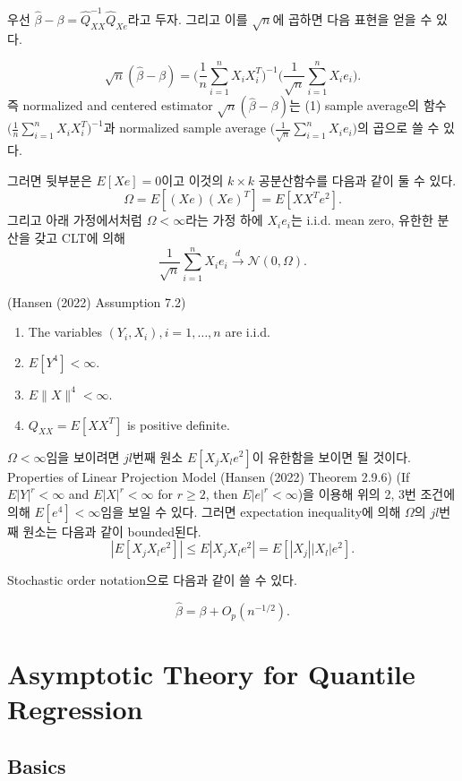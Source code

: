 \documentclass[
  letterpaper,
  DIV=11,
  numbers=noendperiod]{scrreprt}
\providecommand{\tightlist}{%
  \setlength{\itemsep}{0pt}\setlength{\parskip}{0pt}}\usepackage{longtable,booktabs,array}
\theoremstyle{definition}
\theoremstyle{plain}
\theoremstyle{definition}
\theoremstyle{definition}
\theoremstyle{remark}
\begin{document}
우선 \(\hat{\beta}- \beta = \hat{Q}_{XX}^{-1}\hat{Q}_{Xe}\)라고 두자.
그리고 이를 \(\sqrt{n}\)에 곱하면 다음 표현을 얻을 수 있다.

\[
\sqrt{n}(\hat{\beta} - \beta) = \Big( \frac{1}{n}\sum_{i=1}^n X_i X_i^T \Big)^{-1} \Big(\frac{1}{\sqrt{n} }\sum_{i=1}^n X_i e_i \Big).
\]즉 normalized and centered estimator
\(\sqrt{n}(\hat{\beta} - \beta)\)는 (1) sample average의 함수
\(\Big( \frac{1}{n}\sum_{i=1}^n X_i X_i^T \Big)^{-1}\)과 normalized
sample average \(\Big(\frac{1}{\sqrt{n} }\sum_{i=1}^n X_i e_i \Big)\)의
곱으로 쓸 수 있다.

그러면 뒷부분은 \(E[Xe]=0\)이고 이것의 \(k\times k\) 공분산함수를 다음과
같이 둘 수 있다. \[
\Omega = E[(Xe)(Xe)^T] = E[XX^T e^2].
\] 그리고 아래 가정에서처럼 \(\Omega <\infty\)라는 가정 하에
\(X_i e_i\)는 i.i.d. mean zero, 유한한 분산을 갖고 CLT에 의해 \[
\frac{1}{\sqrt{n}} \sum_{i=1}^n X_i e_i \stackrel{d}{\rightarrow}\mathcal{N}(0,\Omega).
\]

(Hansen (2022) Assumption 7.2)

\begin{enumerate}
\def\labelenumi{\arabic{enumi}.}
\tightlist
\item
  The variables \((Y_i, X_i), i=1,\ldots, n\) are i.i.d.
\item
  \(E[Y^4]<\infty\).
\item
  \(E\|X\|^4 <\infty\).
\item
  \(Q_{XX} = E[XX^{T}]\) is positive definite.
\end{enumerate}

\(\Omega <\infty\)임을 보이려면 \(jl\)번째 원소 \(E[X_jX_le^2]\)이
유한함을 보이면 될 것이다. Properties of Linear Projection Model (Hansen
(2022) Theorem 2.9.6) (If \(E|Y|^r <\infty\) and \(E|X|^r <\infty\) for
\(r\geq 2\), then \(E|e|^r <\infty\))을 이용해 위의 2, 3번 조건에 의해
\(E[e^4]<\infty\)임을 보일 수 있다. 그러면 expectation inequality에 의해
\(\Omega\)의 \(jl\)번째 원소는 다음과 같이 bounded된다. \[
|E[X_jX_le^2]|\leq E|X_jX_le^2| = E[|X_j||X_l|e^2].
\]

Stochastic order notation으로 다음과 같이 쓸 수 있다.

\[
\hat{\beta} = \beta + O_p(n^{-1/2}).
\]

\chapter{Asymptotic Theory for Quantile
Regression}\label{asymptotic-theory-for-quantile-regression}

\section{Basics}\label{basics}
\end{document}
